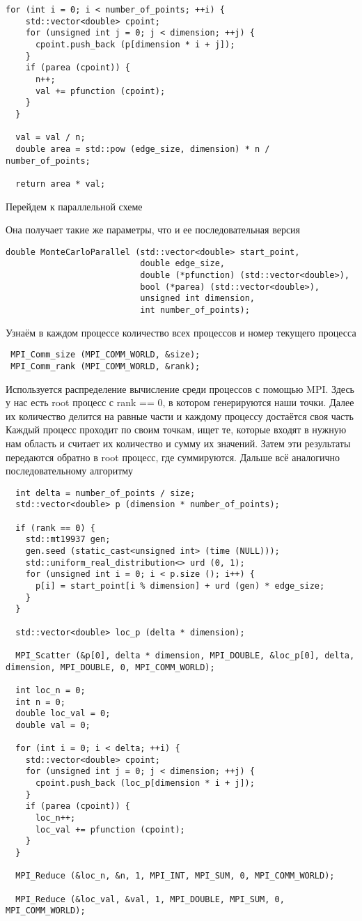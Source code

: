 \documentclass{report}
\begin{document}
\begin{lstlisting}  
for (int i = 0; i < number_of_points; ++i) {
    std::vector<double> cpoint;
    for (unsigned int j = 0; j < dimension; ++j) {
      cpoint.push_back (p[dimension * i + j]);
    }
    if (parea (cpoint)) {
      n++;
      val += pfunction (cpoint);
    }
  }

  val = val / n;
  double area = std::pow (edge_size, dimension) * n / number_of_points;

  return area * val;
  \end{lstlisting}
\par Перейдем к параллельной схеме
\par Она получает такие же параметры, что и ее последовательная версия
\begin{lstlisting}
double MonteCarloParallel (std::vector<double> start_point,
                           double edge_size,
                           double (*pfunction) (std::vector<double>),
                           bool (*parea) (std::vector<double>),
                           unsigned int dimension,
                           int number_of_points);
\end{lstlisting}
Узнаём в каждом процессе количество всех процессов и номер текущего процесса
 \begin{lstlisting}
 MPI_Comm_size (MPI_COMM_WORLD, &size);
 MPI_Comm_rank (MPI_COMM_WORLD, &rank);
 \end{lstlisting} Используется распределение вычисление среди процессов с помощью MPI. Здесь у нас есть root процесс с rank == 0, в котором генерируются наши точки. Далее их количество делится на равные части и каждому процессу достаётся своя часть Каждый процесс проходит по своим точкам, ищет те, которые входят в нужную нам область и считает их количество и сумму их значений.
Затем эти результаты передаются обратно в root процесс, где суммируются.
Дальше всё аналогично последовательному алгоритму\begin{lstlisting}
  int delta = number_of_points / size;
  std::vector<double> p (dimension * number_of_points);

  if (rank == 0) {
    std::mt19937 gen;
    gen.seed (static_cast<unsigned int> (time (NULL)));
    std::uniform_real_distribution<> urd (0, 1);
    for (unsigned int i = 0; i < p.size (); i++) {
      p[i] = start_point[i % dimension] + urd (gen) * edge_size;
    }
  }

  std::vector<double> loc_p (delta * dimension);

  MPI_Scatter (&p[0], delta * dimension, MPI_DOUBLE, &loc_p[0], delta, dimension, MPI_DOUBLE, 0, MPI_COMM_WORLD);     

  int loc_n = 0;
  int n = 0;
  double loc_val = 0;
  double val = 0;

  for (int i = 0; i < delta; ++i) {
    std::vector<double> cpoint;
    for (unsigned int j = 0; j < dimension; ++j) {
      cpoint.push_back (loc_p[dimension * i + j]);
    }
    if (parea (cpoint)) {
      loc_n++;
      loc_val += pfunction (cpoint);
    }
  }

  MPI_Reduce (&loc_n, &n, 1, MPI_INT, MPI_SUM, 0, MPI_COMM_WORLD);  
 
  MPI_Reduce (&loc_val, &val, 1, MPI_DOUBLE, MPI_SUM, 0, MPI_COMM_WORLD);
 \end{lstlisting}
\end{document}
